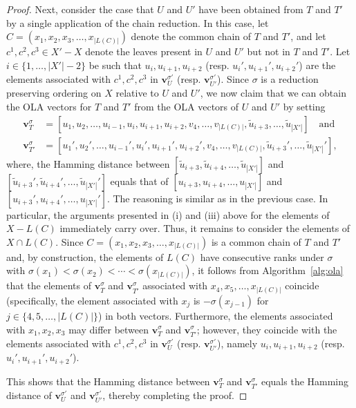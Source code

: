 \documentclass{article}
\begin{document}
\begin{proof}
    Next, consider the case that $U$ and $U'$ have been obtained from $T$ and $T'$ by a single application of the chain reduction. In this case, let $C=(x_1, x_2, x_3, \ldots, x_{|L(C)|})$ denote the common chain of $T$ and $T'$, and let $c^1, c^2, c^3 \in X' - X$ denote the leaves present in $U$ and $U'$ but not in $T$ and $T'$. Let $i \in \{1, \ldots, |X'|-2\}$ be such that $u_i, u_{i+1}, u_{i+2}$ (resp. $u_i', u_{i+1}', u_{i+2}'$) are the elements associated with $c^1, c^2, c^3$ in $\mathbf{v}^{\sigma'}_U$ (resp. $\mathbf{v}^{\sigma'}_{U'}$). Since $\sigma$ is a reduction preserving ordering on $X$ relative to $U$ and $U'$, we now claim that we can obtain the OLA vectors for $T$ and $T'$ from the OLA vectors of $U$ and $U'$ by setting
    \begin{align*}
        \mathbf{v}^{\sigma}_T &= [u_1, u_2, \ldots, u_{i-1}, u_i, u_{i+1}, u_{i+2}, v_4, \ldots, v_{|L(C)|}, \widetilde{u}_{i+3}, \ldots, \widetilde{u}_{|X'|}] \quad \text{and } \\
        \mathbf{v}^{\sigma}_{T'} &= [u_1', u_2', \ldots, u_{i-1}', u_i', u_{i+1}', u_{i+2}', v_4, \ldots, v_{|L(C)|}, \widetilde{u}_{i+3}', \ldots, \widetilde{u}_{|X'|}'],
    \end{align*}
     where, the Hamming distance between $[\widetilde{u}_{i+3}, \widetilde{u}_{i+4}, \ldots, \widetilde{u}_{|X'|}]$ and $[\widetilde{u}_{i+3}',\widetilde{u}_{i+4}', \ldots, \widetilde{u}_{|X'|}']$ equals that of $[u_{i+3}, u_{i+4}, \ldots, u_{|X'|}]$ and  $[u_{i+3}',u_{i+4}', \ldots, u_{|X'|}']$.
     The reasoning is similar as in the previous case. In particular, the arguments presented in (i) and (iii) above for the elements of $X - L(C)$ immediately carry over. Thus, it remains to consider the elements of $X \cap L(C)$. Since $C = (x_1, x_2, x_3, \ldots, x_{|L(C)|})$ is a common chain of $T$ and $T'$ and, by construction, the elements of $L(C)$ have consecutive ranks under $\sigma$ with $\sigma(x_1) < \sigma(x_2) < \cdots < \sigma(x_{|L(C)|})$, it follows from Algorithm~\ref{alg:ola} that the elements of $\mathbf{v}^{\sigma}_T$ and $\mathbf{v}^{\sigma}_{T'}$ associated with $x_4,x_5, \ldots, x_{|L(C)|}$ coincide (specifically, the element associated with $x_j$ is $- \sigma(x_{j-1})$ for $j \in \{4,5, \ldots, |L(C)|\}$) in both vectors. Furthermore, the elements associated with $x_1, x_2, x_3$ may differ between $\mathbf{v}^{\sigma}_T$ and $\mathbf{v}^{\sigma}_{T'}$; however, they coincide with the elements associated with $c^1, c^2, c^3$ in $\mathbf{v}^{\sigma'}_U$ (resp. $\mathbf{v}^{\sigma'}_{U'}$), namely $u_i, u_{i+1}, u_{i+2}$ (resp. $u_i', u_{i+1}', u_{i+2}'$).
     
     This shows that the Hamming distance between $\mathbf{v}^{\sigma}_T$ and $\mathbf{v}^{\sigma}_{T'}$ equals the Hamming distance of $\mathbf{v}^{\sigma'}_U$ and $\mathbf{v}^{\sigma'}_{U'}$, thereby completing the proof.
\end{proof} 
\end{document}
